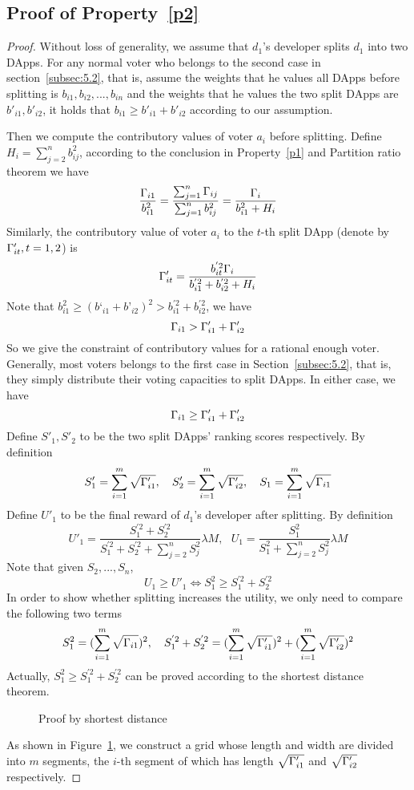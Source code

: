 \subsection{Proof of Property~\ref{p2}}
\label{subsection:proof2}
\begin{proof}
	Without loss of generality, we assume that $d_1$'s developer splits $d_1$ into two DApps. For any normal voter who belongs to the second case in section~\ref{subsec:5.2}, that is, assume the weights that he values all DApps before splitting is $b_{i1},b_{i2},...,b_{in}$ and the weights that he values the two split DApps are $b'_{i1},b'_{i2}$, it holds that $b_{i1} \geq b'_{i1}+b'_{i2}$ according to our assumption.
	
	Then we compute the contributory values of voter $a_i$ before splitting. Define $H_i = \sum_{j=2}^n b_{ij}^2$, according to the conclusion in Property~\ref{p1} and Partition ratio theorem we have 
		 $$\frac{\Gamma_{i1}}{b_{i1}^2} = \frac{\sum_{j=1}^n \Gamma_{ij}}{\sum_{j=1}^n b_{ij}^2} = \frac{\Gamma_i}{b_{i1}^2+H_i}$$
  Similarly, the contributory value of voter $a_i$ to the $t$-th split DApp (denote by $\Gamma'_{it},t=1,2$) is
  	 $$\Gamma'_{it} =  \frac{b_{it}^{'2}\Gamma_i}{b_{i1}^{'2}+b_{i2}^{'2}+H_i}$$
  	 Note that $b_{i1}^2 \geq (b‘_{i1}+b’_{i2})^2 >b_{i1}^{'2}+b_{i2}^{'2}$, we have
  	 $$\Gamma_{i1} > \Gamma'_{i1}+\Gamma'_{i2}$$
  	 So we give the constraint of contributory values for a rational enough voter. Generally, most voters belongs to the first case in Section~\ref{subsec:5.2}, that is, they simply distribute their voting capacities to split DApps. In either case, we have 
  	 	 	$$\Gamma_{i1} \geq \Gamma'_{i1}+\Gamma'_{i2}$$
  	 Define $S'_1,S'_2$ to be the two split DApps' ranking scores respectively. By definition 
  	 	 $$S'_1 =  \sum_{i=1}^m \sqrt{\Gamma'_{i1}},~~~S'_2 =  \sum_{i=1}^m \sqrt{\Gamma'_{i2}},~~~S_1 = \sum_{i=1}^m \sqrt{\Gamma_{i1}}$$
  	Define $U'_1$ to be the final reward of $d_1$'s developer after splitting. By definition 
  		 $$U'_1=\frac{S_1^{'2}+S_2^{'2}}{S_1^{'2}+S_2^{'2}+\sum_{j=2}^n S_j^2} \lambda M,~~~U_1=\frac{S^2_1}{S_1^2+\sum_{j=2}^n S_j^2} \lambda M$$
  	Note that given $S_2,...,S_n$, 
  		 $$ U_1 \geq U'_1 \Leftrightarrow S_1^2 \geq S_1^{'2}+S_2^{'2}$$
   In order to show whether splitting increases the utility, we only need to compare the following two terms
   	 $$S_1^2 = (\sum_{i=1}^m \sqrt{\Gamma_{i1}})^2,~~~S_1^{'2}+S_2^{'2}=  (\sum_{i=1}^m \sqrt{\Gamma'_{i1}})^2+(\sum_{i=1}^m \sqrt{\Gamma'_{i2}})^2$$
   	Actually, $S_1^2 \geq S_1^{'2}+S_2^{'2}$ can be proved according to the shortest distance theorem. 
   		 \begin{figure}
   		 	\centering
   		 	
   		 	\caption{Proof by shortest distance\label{fig:path}}
   		 \end{figure}
   As shown in Figure~\ref{fig:path}, we construct a grid whose length and width are divided into $m$ segments,  the $i$-th segment of which has length $\sqrt{\Gamma'_{i1}}$ and $\sqrt{\Gamma'_{i2}}$ respectively. 
   

\end{proof}
